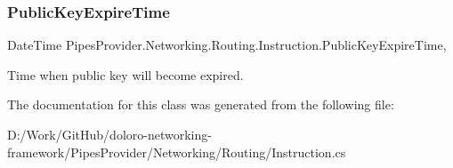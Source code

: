 \subsubsection{\texorpdfstring{Public\+Key\+Expire\+Time}{PublicKeyExpireTime}}
{\footnotesize\ttfamily Date\+Time Pipes\+Provider.\+Networking.\+Routing.\+Instruction.\+Public\+Key\+Expire\+Time\hspace{0.3cm}{\ttfamily [get]}, {}}



Time when public key will become expired. 



The documentation for this class was generated from the following file\+:\begin{DoxyCompactItemize}
\item 
D\+:/\+Work/\+Git\+Hub/doloro-\/networking-\/framework/\+Pipes\+Provider/\+Networking/\+Routing/Instruction.\+cs\end{DoxyCompactItemize}
